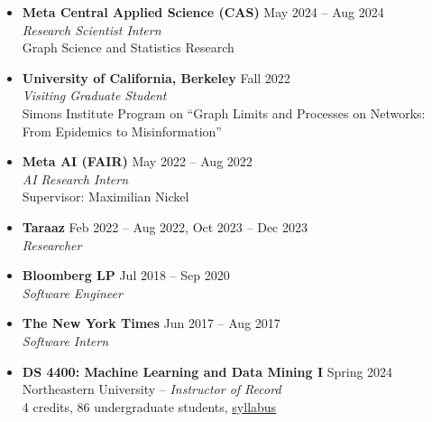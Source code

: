 \documentclass[margin]{res}
\begin{document}
\begin{resume}
\begin{itemize}
\section{Professional \\Experience}
\item[] 
{\bf Meta Central Applied Science (CAS)}  \hfill May 2024 -- Aug 2024\\
{\em{Research Scientist Intern}}\\
Graph Science and Statistics Research

\item[]
{\bf University of California, Berkeley} \hfill Fall 2022\\
{\em{Visiting Graduate Student}} \\
Simons Institute Program on ``Graph Limits and Processes on Networks: From Epidemics to Misinformation''

\item[] 
{\bf Meta AI (FAIR)}  \hfill May 2022 -- Aug 2022\\
{\em{AI Research Intern}}\\
Supervisor: Maximilian Nickel

\item[]
{\bf Taraaz}  \hfill Feb 2022 -- Aug 2022, Oct 2023 -- Dec 2023\\
{\em{Researcher}}

\item[] 
{\bf Bloomberg LP}  \hfill Jul 2018 -- Sep 2020\\
{\em{Software Engineer}}

\item[]
{\bf The New York Times}  \hfill  Jun 2017 -- Aug 2017\\
 {\em{Software Intern}}

\end{itemize}

\begin{itemize}
\section{Teaching}
\item[] 
{\bf DS 4400: Machine Learning and Data Mining I} \hfill Spring 2024\\
Northeastern University -- {\em{Instructor of Record}}\\
4 credits, 86 undergraduate students,  \href{https://dliu18.github.io/teaching/ds4400spr24}{syllabus} 
\end{itemize}


\end{resume}
\end{document}
